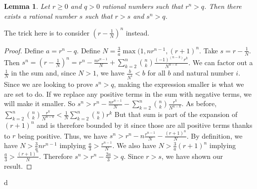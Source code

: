 \documentclass[12pt]{article}
\newtheorem{lemma}{Lemma}
\theoremstyle{remark}
\begin{document}
\begin{lemma}
Let $r \geq 0 $ and $q > 0$ rational numbers such that $r^n > q$. Then there exists a rational number $s$ such that $r > s$ and $s^n > q$.
\end{lemma}

The trick here is to consider $(r-\tfrac{1}{N})^n$ instead. 

\begin{proof}
Define $a = r^n - q$. Define $N = \tfrac{3}{a} \max(1,n r^{n-1}, (r+1)^n$.  Take $s = r - \tfrac{1}{N}$. Then $s^n = (r- \tfrac{1}{N})^n = r^n - \tfrac{n r^{n-1}}{N} + \sum_{k=2}^{n} \binom{n}{k} \tfrac{ (-1)^(n-k) r^k}{N^{n-k}}$. We can factor out a $\tfrac{1}{N}$ in the sum and, since $N > 1$, we have $\tfrac{b}{N^i} < b$ for all $b$ and natural number $i$. Since we are looking to prove $s^n > q$, making the expression smaller is what we are set to do. If we replace any positive terms in the sum with negative terms, we will make it smaller. So $s^n > r^n - \tfrac{n r^{n-1}}{N} - \sum_{k=2}^{n} \binom{n}{k} \tfrac{r^k}{N^{n-k}}$. As before, $\sum_{k=2}^{n} \binom{n}{k} \tfrac{r^k}{N^{n-k}} < \tfrac{1}{N} \sum_{k=2}^{n} \binom{n}{k} r^k$  But that sum is part of the expansion of $(r+1)^n$ and is therefore bounded by it since those are all positive terms thanks to $r$ being positive. Thus, we have $s^n > r^n - n \tfrac{r^{n-1}}{N} - \tfrac{ (r+1)^n }{N}$.  By definition, we have $N > \tfrac{3}{a} n r^{n-1}$ implying $\tfrac{a}{3} > \tfrac{ r^{n-1}}{N}$. We also have $N > \tfrac{3}{a} (r+1)^n$ implying $\tfrac{a}{3} > \tfrac{(r+1)^n}{N}$. Therefore $s^n > r^n - \tfrac{2 a}{3} > q$. Since $r>s$, we have shown our result. 
\end{proof}



\begin{thebibliography}{28.}
d

\end{thebibliography}
\end{document}
